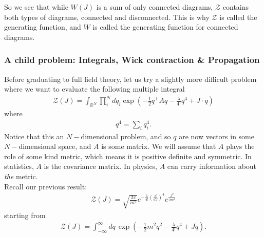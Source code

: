 \documentclass{book}
\theoremstyle{definition}
\newcommand{\f}[2]{\frac{#1}{#2}}
\newcommand{\lp}{\left(}
\newcommand{\rp}{\right)}
\newcommand{\Z}{\mathcal{Z}}
\begin{document}
So we see that while $W(J)$ is a sum of only connected diagrams, $\Z$ contains both types of diagrams, connected and disconnected. This is why $\Z$ is called the generating function, and $W$ is called the generating function for connected diagrams. 













\subsubsection{A child problem: Integrals, Wick contraction \& Propagation}


Before graduating to full field theory, let us try a slightly more difficult problem where we want to evaluate the following multiple integral
\begin{align}
\boxed{\Z(J) = \int_{\mathbb{R}^N} \prod_i^N dq_i \exp\lp -\f{1}{2}q^\top A q - \f{\lambda}{4!}q^4 + J\cdot q  \rp}
\end{align}
where
\begin{align}
q^4 = \sum_i q_i^4.
\end{align}
Notice that this an $N-$dimensional problem, and so $q$ are now vectors in some $N-$dimensional space, and $A$ is some matrix. We will assume that $A$ plays the role of some kind metric, which means it is positive definite and symmetric. In statistics, $A$ is the covariance matrix. In physics, $A$ can carry information about \textit{the} metric. \\

Recall our previous result:
\begin{align}
\Z(J)  = \sqrt{\f{2\pi}{m^2}} e^{-\f{\lambda}{4!}\lp \f{d}{dJ} \rp^4} e^\f{J^2}{2m^2}
\end{align}
starting from 
\begin{align}
\Z(J) = \int^\infty_{-\infty} dq\, \exp\lp -\f{1}{2}m^2 q^2 - \f{\lambda}{4!}q^4 + Jq \rp.
\end{align}
\end{document}
